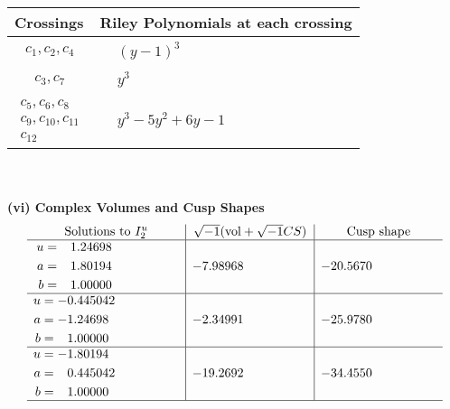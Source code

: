 \documentclass[1p]{elsarticle_modified}
\theoremstyle{definition}
\newcommand{\I}{\sqrt{-1}}
\begin{document}
\begin{tabular}{m{50pt}|m{274pt}}
Crossings & \hspace{64pt}Riley Polynomials at each crossing \\
\hline $$\begin{aligned}c_{1},c_{2},c_{4}\end{aligned}$$&$\begin{aligned}
&(y-1)^3
\end{aligned}$\\
\hline $$\begin{aligned}c_{3},c_{7}\end{aligned}$$&$\begin{aligned}
&y^3
\end{aligned}$\\
\hline $$\begin{aligned}c_{5},c_{6},c_{8}\\c_{9},c_{10},c_{11}\\c_{12}\end{aligned}$$&$\begin{aligned}
&y^3-5 y^2+6 y-1
\end{aligned}$\\
\hline
\end{tabular}\\~\\
\newpage\flushleft \textbf{(vi) Complex Volumes and Cusp Shapes}
$$\begin{array}{c|c|c}  
\text{Solutions to }I^u_{2}& \I (\text{vol} + \sqrt{-1}CS) & \text{Cusp shape}\\
 \hline 
\begin{aligned}
u &= \phantom{-}1.24698\phantom{ +0.000000I} \\
a &= \phantom{-}1.80194\phantom{ +0.000000I} \\
b &= \phantom{-}1.00000\phantom{ +0.000000I}\end{aligned}
 & -7.98968\phantom{ +0.000000I} & -20.5670\phantom{ +0.000000I} \\ \hline\begin{aligned}
u &= -0.445042\phantom{ +0.000000I} \\
a &= -1.24698\phantom{ +0.000000I} \\
b &= \phantom{-}1.00000\phantom{ +0.000000I}\end{aligned}
 & -2.34991\phantom{ +0.000000I} & -25.9780\phantom{ +0.000000I} \\ \hline\begin{aligned}
u &= -1.80194\phantom{ +0.000000I} \\
a &= \phantom{-}0.445042\phantom{ +0.000000I} \\
b &= \phantom{-}1.00000\phantom{ +0.000000I}\end{aligned}
 & -19.2692\phantom{ +0.000000I} & -34.4550\phantom{ +0.000000I}\\
 \hline 
 \end{array}$$\newpage
\end{document}
